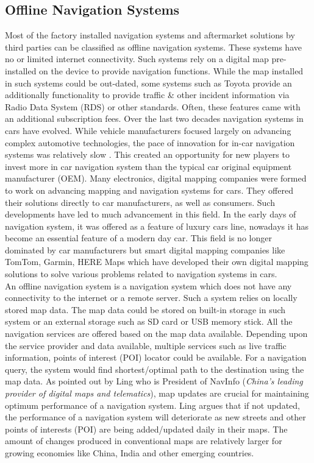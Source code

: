 \subsection{Offline Navigation Systems} \label{offlinenav}
Most of the factory installed navigation systems and aftermarket solutions by third parties can be classified as offline navigation systems. These systems have no or limited internet connectivity. Such systems rely on a digital map pre-installed on the device to provide navigation functions. While the map installed in such systems could be out-dated, some systems such as Toyota \citep{ishikawa1991map} provide an additionally functionality to provide traffic \& other incident information via Radio Data System (RDS) or other standards. Often, these features came with an additional subscription fees. Over the last two decades navigation systems in cars have evolved. While vehicle manufacturers focused largely on advancing complex automotive technologies, the pace of innovation for in-car navigation systems was relatively slow \cite{schaminee2011short}. This created an opportunity for new players to invest more in car navigation system than the typical car original equipment manufacturer (OEM). Many electronics, digital mapping companies were formed to work on advancing mapping and navigation systems for cars. They offered their solutions directly to car manufacturers, as well as consumers. Such developments have led to much advancement in this field. In the early days of navigation system, it was offered as a feature of luxury cars line, nowadays it has become an essential feature of a modern day car. This field is no longer dominated by car manufacturers but smart digital mapping companies like TomTom, Garmin, HERE Maps which have developed their own digital mapping solutions to solve various problems related to navigation systems in cars.\\

An offline navigation system is a navigation system which does not have any connectivity to the internet or a remote server. Such a system relies on locally stored map data. The map data could be stored on built-in storage in such system or an external storage such as SD card or USB memory stick. All the navigation services are offered based on the map data available. Depending upon the service provider and data available, multiple services such as live traffic information, points of interest (POI) locator could be available. For a navigation query, the system would find shortest/optimal path to the destination using the map data. As pointed out by Ling \cite{navinfo} who is President of NavInfo (\textit{China's leading provider of digital maps and telematics}), map updates are crucial for maintaining optimum performance of a navigation system. Ling argues that if not updated, the performance of a navigation system will deteriorate as new streets and other points of interests (POI) are being added/updated daily in their maps. The amount of changes produced in conventional maps are relatively larger for growing economies like China, India and other emerging countries. \\

